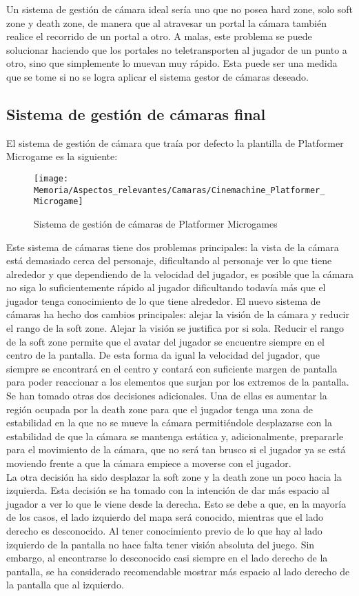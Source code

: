 Un sistema de gestión de cámara ideal sería uno que no posea hard zone, solo soft zone y death zone, de manera que al atravesar un portal la cámara también realice el recorrido de un portal a otro. A malas, este problema se puede solucionar haciendo que los portales no teletransporten al jugador de un punto a otro, sino que simplemente lo muevan muy rápido. Esta puede ser una medida que se tome si no se logra aplicar el sistema gestor de cámaras deseado.

\subsection{Sistema de gestión de cámaras final}
El sistema de gestión de cámara que traía por defecto la plantilla de Platformer Microgame es la siguiente:

\clearpage
\begin{figure}[h]
\texttt{[image: Memoria/Aspectos\_relevantes/Camaras/Cinemachine\_Platformer\_Microgame]}
\caption{Sistema de gestión de cámaras de Platformer Microgames}
\end{figure}

Este sistema de cámaras tiene dos problemas principales: la vista de la cámara está demasiado cerca del personaje, dificultando al personaje ver lo que tiene alrededor y que dependiendo de la velocidad del jugador, es posible que la cámara no siga lo suficientemente rápido al jugador dificultando todavía más que el jugador tenga conocimiento de lo que tiene alrededor. El nuevo sistema de cámaras ha hecho dos cambios principales: alejar la visión de la cámara y reducir el rango de la soft zone. Alejar la visión se justifica por si sola. Reducir el rango de la soft zone permite que el avatar del jugador se encuentre siempre en el centro de la pantalla. De esta forma da igual la velocidad del jugador, que siempre se encontrará en el centro y contará con suficiente margen de pantalla para poder reaccionar a los elementos que surjan por los extremos de la pantalla.\\
Se han tomado otras dos decisiones adicionales. Una de ellas es aumentar la región ocupada por la death zone para que el jugador tenga una zona de estabilidad en la que no se mueve la cámara permitiéndole desplazarse con la estabilidad de que la cámara se mantenga estática y, adicionalmente, prepararle para el movimiento de la cámara, que no será tan brusco si el jugador ya se está moviendo frente a que la cámara empiece a moverse con el jugador.\\
La otra decisión ha sido desplazar la soft zone y la death zone un poco hacia la izquierda. Esta decisión se ha tomado con la intención de dar más espacio al jugador a ver lo que le viene desde la derecha. Esto se debe a que, en la mayoría de los casos, el lado izquierdo del mapa será conocido, mientras que el lado derecho es desconocido. Al tener conocimiento previo de lo que hay al lado izquierdo de la pantalla no hace falta tener visión absoluta del juego. Sin embargo, al encontrarse lo desconocido casi siempre en el lado derecho de la pantalla, se ha considerado recomendable mostrar más espacio al lado derecho de la pantalla que al izquierdo.

